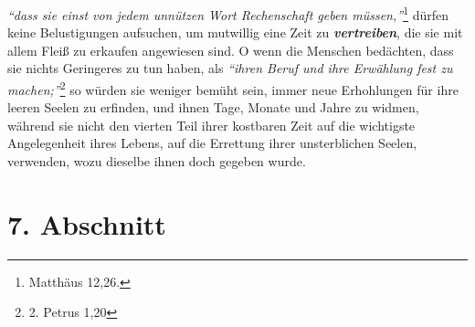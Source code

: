 \textit{"`dass sie einst von jedem unnützen Wort Rechenschaft geben
müssen,"'}\footnote{Matthäus 12,26.}
dürfen keine Belustigungen aufsuchen, um
mutwillig eine Zeit zu \textbf{\textit{vertreiben}}, die sie mit allem Fleiß zu
erkaufen
angewiesen sind. O wenn die Menschen bedächten, dass sie nichts Geringeres zu
tun haben, als
\textit{"`ihren Beruf und ihre Erwählung fest zu machen;"'}\footnote{2. Petrus
1,20}
so würden sie weniger bemüht sein, immer neue Erhohlungen für ihre
leeren Seelen zu erfinden, und ihnen Tage, Monate und Jahre zu widmen, während
sie nicht den vierten Teil ihrer kostbaren Zeit auf die wichtigste
Angelegenheit ihres Lebens, auf die Errettung ihrer unsterblichen Seelen,
verwenden, wozu dieselbe ihnen doch gegeben wurde.

\section{7. Abschnitt} \label{kap15_ab7}

